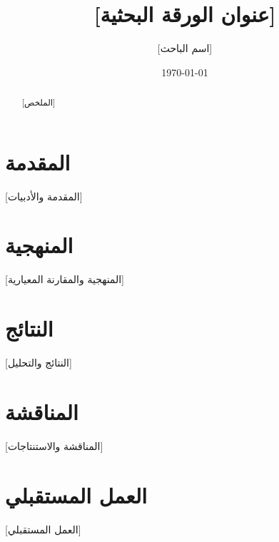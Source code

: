 \documentclass[12pt,a4paper]{article}
\title{[عنوان الورقة البحثية]}
\author{[اسم الباحث] \\ [الجهة المحلية]}
\date{\today}
\begin{document}
\maketitle

\begin{abstract}
[الملخص]
\end{abstract}

\section{المقدمة}
[المقدمة والأدبيات]

\section{المنهجية}
[المنهجية والمقارنة المعيارية]

\section{النتائج}
[النتائج والتحليل]

\section{المناقشة}
[المناقشة والاستنتاجات]

\section{العمل المستقبلي}
[العمل المستقبلي]



\end{document}
